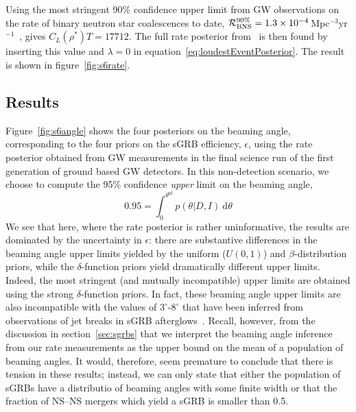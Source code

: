 \documentclass[twocolumn,nofootinbib]{revtex4-1}
\newcommand{\cbcrate}{{{\mathcal R}}}
\newcommand{\diff}{{\mathrm d}}
\newcommand{\rhostar}{{\rho^*}}
\newcommand{\BNS}{\ac{NS}--\ac{NS}\xspace}
\begin{document}
Using the most stringent 90\% confidence upper limit from \ac{GW} observations on the rate of binary neutron star coalescences to date, $\cbcrate^{90\%}_{{\rm BNS}} = 1.3\times 10^{-4}$\,Mpc$^{-3}$yr$^{-1}$~\cite{Colaboration:2011np}, gives $C_L(\rhostar)T=17712$.
The full rate posterior from~\cite{Colaboration:2011np} is then found by inserting this value and $\lambda=0$ in equation~\ref{eq:loudestEventPosterior}.
The result is shown in figure~\ref{fig:s6rate}.



\subsection{Results}
Figure~\ref{fig:s6angle} shows the four posteriors on the beaming angle, corresponding to the four priors on the \ac{sGRB} efficiency, $\epsilon$, using the rate posterior obtained from \ac{GW} measurements in the final science run of the first generation of ground based \ac{GW} detectors.
In this non-detection scenario, we choose to compute the 95\% confidence \emph{upper} limit on the beaming angle,
\begin{equation}
    \label{eq:beaming_upper_limit}
    0.95 = \int_0^{\theta^{\mathrm{ul}}} p(\theta|D,I)~\diff \theta
\end{equation}
%
We see that here, where the rate posterior is rather uninformative, the results are dominated by the uncertainty in $\epsilon$: there are substantive differences in the beaming angle upper limits yielded by the uniform ($U(0,1)$) and $\beta$-distribution priors, while the $\delta$-function priors yield dramatically different upper limits.
Indeed, the most stringent (and mutually incompatible) upper limits are obtained using the strong $\delta$-function priors.
In fact, these beaming angle upper limits are also incompatible with the values of $3^{\circ}\mbox{-}8^{\circ}$ that have been inferred from observations of jet breaks in \ac{sGRB} afterglows~\cite{Fong:2013lba,2006MNRAS.367L..42P, 2012A&A...538L...7N}.
Recall, however, from the discussion in section~\ref{sec:sgrbs} that we interpret the beaming angle inference from our rate measurements as the upper bound on the mean of a population of beaming angles.
It would, therefore, seem premature to conclude that there is tension in these results; instead, we can only state that either the population of \acp{sGRB} have a distributio of beaming angles with some finite width or that the fraction of \BNS mergers which yield a \ac{sGRB} is smaller than 0.5.
\end{document}
